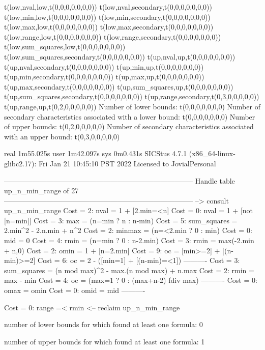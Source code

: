 t(low,nval,low,t(0,0,0,0,0,0,0))
t(low,nval,secondary,t(0,0,0,0,0,0,0))
t(low,min,low,t(0,0,0,0,0,0,0))
t(low,min,secondary,t(0,0,0,0,0,0,0))
t(low,max,low,t(0,0,0,0,0,0,0))
t(low,max,secondary,t(0,0,0,0,0,0,0))
t(low,range,low,t(0,0,0,0,0,0,0))
t(low,range,secondary,t(0,0,0,0,0,0,0))
t(low,sum_squares,low,t(0,0,0,0,0,0,0))
t(low,sum_squares,secondary,t(0,0,0,0,0,0,0))
t(up,nval,up,t(0,0,0,0,0,0,0))
t(up,nval,secondary,t(0,0,0,0,0,0,0))
t(up,min,up,t(0,0,0,0,0,0,0))
t(up,min,secondary,t(0,0,0,0,0,0,0))
t(up,max,up,t(0,0,0,0,0,0,0))
t(up,max,secondary,t(0,0,0,0,0,0,0))
t(up,sum_squares,up,t(0,0,0,0,0,0,0))
t(up,sum_squares,secondary,t(0,0,0,0,0,0,0))
t(up,range,secondary,t(0,3,0,0,0,0,0))
t(up,range,up,t(0,2,0,0,0,0,0))
Number of lower bounds:                                             t(0,0,0,0,0,0,0)
Number of secondary characteristics associated with a lower bound:  t(0,0,0,0,0,0,0)
Number of upper bounds:                                             t(0,2,0,0,0,0,0)
Number of secondary characteristics associated with an upper bound: t(0,3,0,0,0,0,0)

real	1m55.025s
user	1m42.097s
sys	0m0.431s
SICStus 4.7.1 (x86_64-linux-glibc2.17): Fri Jan 21 10:45:10 PST 2022
Licensed to JovialPersonal


--------------------------------------------------------------------------------
Handle table up_n_min_range of 27
--------------------------------------------------------------------------------
--> consult up_n_min_range
Cost =  2:  nval        = 1 + [2.min=<n]
Cost =  0:  nval        = 1 + [not [n=min]]
Cost =  3:  max         = (n=min ? n : n-min)
Cost =  5:  sum_squares = 2.min^2 - 2.n.min + n^2
Cost =  2:  minmax      = (n=<2.min ? 0 : min)
Cost =  0:  mid         = 0
Cost =  4:  rmin        = (n=min ? 0 : n-2.min)
Cost =  3:  rmin        = max(-2.min + n,0)
Cost =  2:  omin        = 1 + [n=2.min]
Cost =  9:  oc          = [min>=2] + [(n-min)>=2]
Cost =  6:  oc          = 2 - ([min=1] + [(n-min)=<1])
----------
Cost =  3:  sum_squares = (n mod max)^2 - max.(n mod max) + n.max
Cost =  2:  rmin        = max - min
Cost =  4:  oc          = (max=1 ? 0 : (max+n-2) fdiv max)
----------
Cost =  0:  omax        = omin
Cost =  0:  omid        = mid
----------

Cost =  0:  range =< rmin
<-- reclaim up_n_min_range

number of lower bounds for which found at least one formula: 0

number of upper bounds for which found at least one formula: 1


